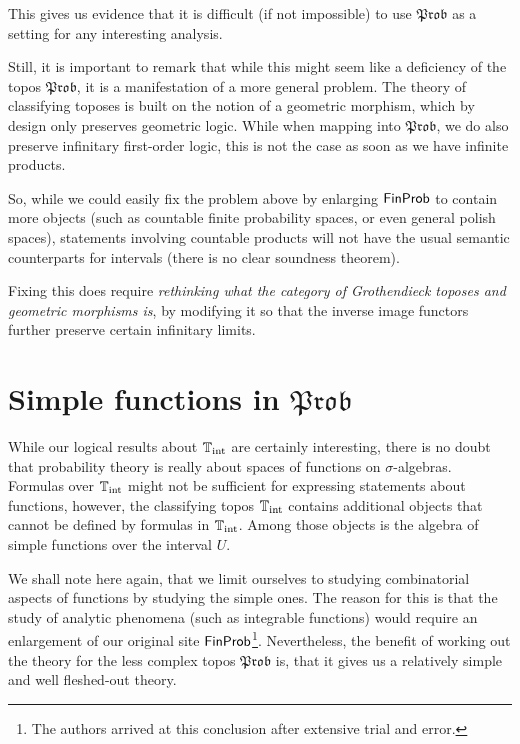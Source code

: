 \documentclass[a4paper]{amsproc}
\theoremstyle{plain}
\theoremstyle{definition}
\theoremstyle{remark}
\numberwithin{equation}{section}
\newcommand{\FinProb}{\textup{\textsf{FinProb}}}
\newcommand{\Prob}{\mathfrak{Prob}}
\begin{document}
This gives us evidence that it is difficult (if not impossible) to use $\Prob$ as a setting for any interesting analysis.

Still, it is important to remark that while this might seem like a deficiency of the topos $\Prob$, it is a manifestation of a more general problem. The theory of classifying toposes is built on the notion of a geometric morphism, which by design only preserves geometric logic. While when mapping into $\Prob$, we do also preserve infinitary first-order logic, this is not the case as soon as we have infinite products.

So, while we could easily fix the problem above by enlarging $\FinProb$ to contain more objects (such as countable finite probability spaces, or even general polish spaces), statements involving countable products will not have the usual semantic counterparts for intervals (there is no clear soundness theorem).

Fixing this does require \emph{rethinking what the category of Grothendieck toposes and geometric morphisms is}, by modifying it so that the inverse image functors further preserve certain infinitary limits.

\section{Simple functions in $\Prob$}\label{section_simple_functions}

While our logical results about $\mathbb{T}_{\textup{int}}$ are certainly interesting, there is no doubt that probability theory is really about spaces of functions on $\sigma$-algebras. Formulas over $\mathbb{T}_{\textup{int}}$ might not be sufficient for expressing statements about functions, however, the classifying topos $\mathbb{T}_{\textup{int}}$ contains additional objects that cannot be defined by formulas in $\mathbb{T}_{\textup{int}}$. Among those objects is the algebra of simple functions over the interval $U$.

We shall note here again, that we limit ourselves to studying combinatorial aspects of functions by studying the simple ones. The reason for this is that the study of analytic phenomena (such as integrable functions) would require an enlargement of our original site $\FinProb$\footnote{The authors arrived at this conclusion after extensive trial and error.}. Nevertheless, the benefit of working out the theory for the less complex topos $\Prob$ is, that it gives us a relatively simple and well fleshed-out theory.
\end{document}
